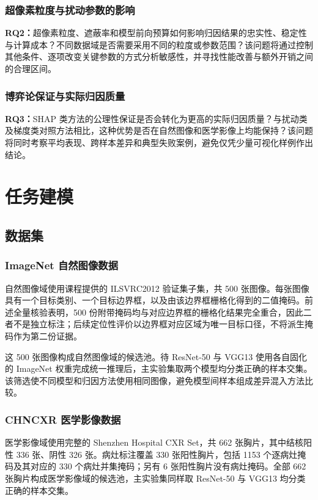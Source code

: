 \subsection{超像素粒度与扰动参数的影响}

\textbf{RQ2：}超像素粒度、遮蔽率和模型前向预算如何影响归因结果的忠实性、稳定性与计算成本？不同数据域是否需要采用不同的粒度或参数范围？该问题将通过控制其他条件、逐项改变关键参数的方式分析敏感性，并寻找性能改善与额外开销之间的合理区间。

\subsection{博弈论保证与实际归因质量}

\textbf{RQ3：}SHAP 类方法的公理性保证是否会转化为更高的实际归因质量？与扰动类及梯度类对照方法相比，这种优势是否在自然图像和医学影像上均能保持？该问题将同时考察平均表现、跨样本差异和典型失败案例，避免仅凭少量可视化样例作出结论。


\chapter{任务建模}

\section{数据集}

\subsection{ImageNet 自然图像数据}

自然图像域使用课程提供的 ILSVRC2012 验证集子集，共 500 张图像。每张图像具有一个目标类别、一个目标边界框，以及由该边界框栅格化得到的二值掩码。前述全量核验表明，500 份附带掩码均与对应边界框的栅格化结果完全重合，因此二者不是独立标注；后续定位性评价以边界框对应区域为唯一目标口径，不将派生掩码作为第二份证据。

这 500 张图像构成自然图像域的候选池。待 ResNet-50 与 VGG13 使用各自固化的 ImageNet 权重完成统一推理后，主实验集取两个模型均分类正确的样本交集。该筛选使不同模型和归因方法使用相同图像，避免模型间样本组成差异混入方法比较。

\subsection{CHNCXR 医学影像数据}

医学影像域使用完整的 Shenzhen Hospital CXR Set\cite{jaeger2014chncxr}，共 662 张胸片，其中结核阳性 336 张、阴性 326 张。病灶标注覆盖 330 张阳性胸片，包括 1153 个逐病灶掩码及其对应的 330 个病灶并集掩码；另有 6 张阳性胸片没有病灶掩码。全部 662 张胸片构成医学影像域的候选池，主实验集同样取 ResNet-50 与 VGG13 均分类正确的样本交集。

